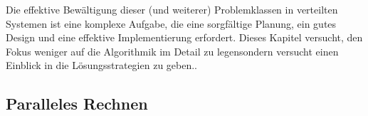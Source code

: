 Die effektive Bewältigung dieser (und weiterer) Problemklassen in verteilten Systemen ist eine komplexe Aufgabe, die eine sorgfältige Planung, ein gutes Design und eine effektive Implementierung erfordert. Dieses Kapitel versucht, den Fokus weniger auf die Algorithmik im Detail zu legensondern versucht einen Einblick in die Lösungsstrategien zu geben..

\subsection{Paralleles Rechnen}

